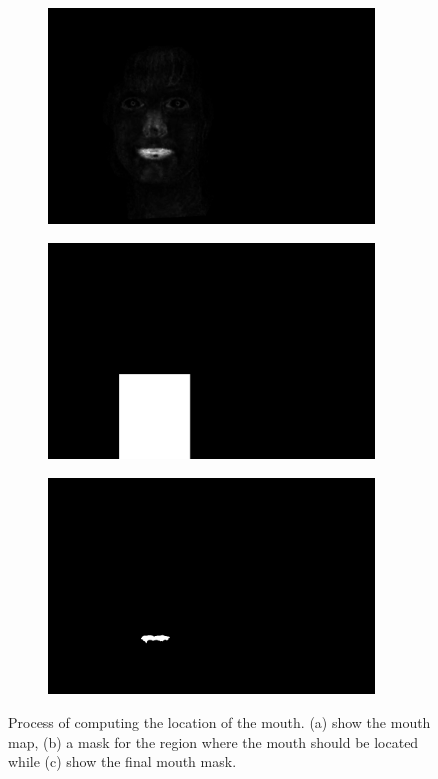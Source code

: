 \begin{figure}[H]
\centering

\begin{subfigure}{.33\textwidth}
  \centering
  \includegraphics[width=0.95\textwidth]{img/fd/MouthMask.png}
  \caption{}
\end{subfigure}%
\begin{subfigure}{.33\textwidth}
  \centering
  \includegraphics[width=0.95\textwidth]{img/fd/notNonMouthMask.png}
  \caption{}
\end{subfigure}%
\begin{subfigure}{.33\textwidth}
  \centering
  \includegraphics[width=0.95\textwidth]{img/fd/MouthBlob.png}
  \caption{}
\end{subfigure}%

\caption{Process of computing the location of the mouth. (a) show the mouth map, (b) a mask for the region where the mouth should be located while (c) show the final mouth mask.}
\label{fig:mouthMap}
\end{figure}